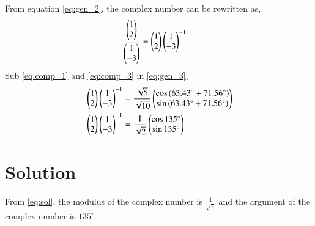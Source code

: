 \documentclass[journal,12pt,twocolumn]{IEEEtran}
\begin{document}
From equation \eqref{eq:gen_2}, the complex number can be rewritten as,
\begin{align}
& \frac{\begin{pmatrix}1\\ 2\end{pmatrix}}{\begin{pmatrix}1\\ -3\end{pmatrix}} = \begin{pmatrix}1\\ 2\end{pmatrix} \begin{pmatrix}1\\ -3\end{pmatrix}^{-1} \label{eq:gen_3}
\end{align}
Sub \eqref{eq:comp_1} and \eqref{eq:comp_3} in \eqref{eq:gen_3},
\begin{align}
&\begin{pmatrix}1\\ 2\end{pmatrix} \begin{pmatrix}1\\ -3\end{pmatrix}^{-1} =\frac{\sqrt{5}}{\sqrt{10}}\begin{pmatrix}\cos{(63.43^{\circ}+71.56^{\circ})}\\ \sin{(63.43^{\circ}+71.56^{\circ})}\end{pmatrix}\\
&\begin{pmatrix}1\\ 2\end{pmatrix} \begin{pmatrix}1\\ -3\end{pmatrix}^{-1} = \frac{1}{\sqrt{2}}\begin{pmatrix}\cos{135^{\circ}}\\ \sin{135^{\circ}}\end{pmatrix} \label{eq:sol}
\end{align}


\section{Solution}

From \eqref{eq:sol}, the modulus of the complex number is $\frac{1}{\sqrt{2}}$ and the argument of the complex number is $135^{\circ}$.

\\
\end{document}
